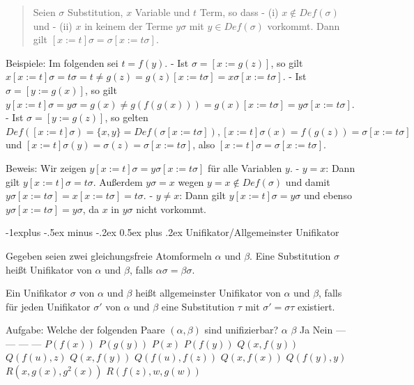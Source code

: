 \documentclass[a4paper]{article}
\makeatletter
\renewcommand{\subsection}{\@startsection{subsection}{2}{0mm}%
                {-1explus -.5ex minus -.2ex}%
                {0.5ex plus .2ex}%
                {\normalfont\normalsize\bfseries}}
\makeatother
\begin{document}
\begin{multicols}{3}
\begin{quote}
    Seien $\sigma$ Substitution, $x$ Variable und $t$ Term, so dass - (i)
    $x\not\in Def(\sigma)$ und - (ii) $x$ in keinem der Terme $y\sigma$ mit
    $y\in Def(\sigma)$ vorkommt. Dann gilt
    $[x:=t]\sigma=\sigma[x:=t\sigma]$.
  \end{quote}

  Beispiele: Im folgenden sei $t=f(y)$. - Ist $\sigma=[x:=g(z)]$, so gilt
  $x[x:=t]\sigma=t\sigma=t\not=g(z) =g(z)[x:=t\sigma] =x\sigma[x:=t\sigma]$.
  - Ist $\sigma= [y:=g(x)]$, so gilt
  $y[x:=t]\sigma=y\sigma=g(x) \not=g(f(g(x)))= g(x) [x:=t\sigma] =y\sigma[x:=t\sigma]$.
  - Ist $\sigma= [y:=g(z)]$, so gelten
  $Def([x:=t]\sigma) =\{x,y\}=Def(\sigma[x:=t\sigma]),[x:=t]\sigma(x) =f(g(z)) =\sigma[x:=t\sigma]$
  und $[x:=t]\sigma(y) =\sigma(z) =\sigma[x:=t\sigma]$, also
  $[x:=t]\sigma=\sigma[x:=t\sigma]$.

  Beweis: Wir zeigen $y[x:=t]\sigma=y\sigma[x:=t\sigma]$ für alle
  Variablen $y$. - $y=x$: Dann gilt $y[x:=t]\sigma=t\sigma$. Außerdem
  $y\sigma=x$ wegen $y=x\not\in Def(\sigma)$ und damit
  $y\sigma[x:=t\sigma]=x[x:=t\sigma]=t\sigma$. - $y\not =x$: Dann gilt
  $y[x:=t]\sigma=y\sigma$ und ebenso $y\sigma[x:=t\sigma]=y\sigma$, da $x$
  in $y\sigma$ nicht vorkommt.

  \subsection{Unifikator/Allgemeinster
    Unifikator}\label{unifikatorallgemeinster-unifikator}

  Gegeben seien zwei gleichungsfreie Atomformeln $\alpha$ und $\beta$.
  Eine Substitution $\sigma$ heißt Unifikator von $\alpha$ und $\beta$,
  falls $\alpha\sigma=\beta\sigma$.

  Ein Unifikator $\sigma$ von $\alpha$ und $\beta$ heißt allgemeinster
  Unifikator von $\alpha$ und $\beta$, falls für jeden Unifikator
  $\sigma'$ von $\alpha$ und $\beta$ eine Substitution $\tau$ mit
  $\sigma'=\sigma \tau$ existiert.

  Aufgabe: Welche der folgenden Paare $(\alpha,\beta)$ sind unifizierbar?
  \textbar{} $\alpha$ \textbar{} $\beta$ \textbar{} Ja \textbar{} Nein
  \textbar{} \textbar{} --- \textbar{} --- \textbar{} --- \textbar{} ---
  \textbar{} \textbar{} $P(f(x))$ \textbar{} $P(g(y))$ \textbar{}
  \textbar{} \textbar{} $P(x)$ \textbar{}$P(f(y))$\textbar{}\textbar{}
  \textbar{}$Q(x,f(y))$\textbar{} $Q(f(u),z)$\textbar{}\textbar{}
  \textbar{}$Q(x,f(y))$\textbar{} $Q(f(u),f(z))$\textbar{}\textbar{}
  \textbar{}$Q(x,f(x))$\textbar{} $Q(f(y),y)$\textbar{}\textbar{}
  \textbar{}$R(x,g(x),g^2 (x))$\textbar{} $R(f(z),w,g(w))$
  \textbar{}\textbar{}


\end{multicols}
\end{document}
